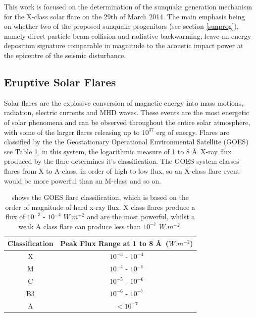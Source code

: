 This work is focused on the determination of the sunquake generation mechanism for the X-class solar flare on the 29th of March 2014. The main emphasis being on whether two of the proposed sunquake progenitors (see section \ref{sunprog}), namely direct particle beam collision and radiative backwarming, leave an energy deposition signature comparable in magnitude to the acoustic impact power at the epicentre of the seismic disturbance.      




\subsection{Eruptive Solar Flares}\label{flares}

Solar flares are the explosive conversion of magnetic energy into mass motions, radiation, electric currents and MHD waves. These events are the most energetic of solar phenomena and can be observed throughout the entire solar atmosphere, with some of the larger flares releasing up to $10^{37}$ erg of energy. Flares are classified by the the Geostationary Operational Environmental Satellite (GOES) see Table \ref{goes}, in this system, the logarithmic measure of 1 to 8 \AA\ X-ray flux produced by the flare determines it's classification. The GOES system classes flares from X to A-class, in order of high to low flux, so an X-class flare event would be more powerful than an M-class and so on. \\

\begin{table}[h]
\centering
\begin{tabular}{|c|c|}\label{GOES}
Classification & Peak Flux Range at 1 to 8 \AA\ ($W.m^{-2}$) \\
\hline
X & $10^{-3}$ - $10^{-4}$\\
M & $10^{-4}$ - $10^{-5}$\\
C & $10^{-5}$ - $10^{-6}$\\
B3 & $10^{-6}$ - $10^{-7}$\\
A & $<10^{-7}$\\
\end{tabular}
\caption{shows the GOES flare classification, which is based on the order of magnitude of hard x-ray flux. X class flares produce a flux of $10^{-3}$ - $10^{-4}$ $W.m^{-2}$ and are the most powerful, whilst a weak A class flare can produce less than $10^{-7}$ $W.m^{-2}$.}\label{goes}
\end{table}

